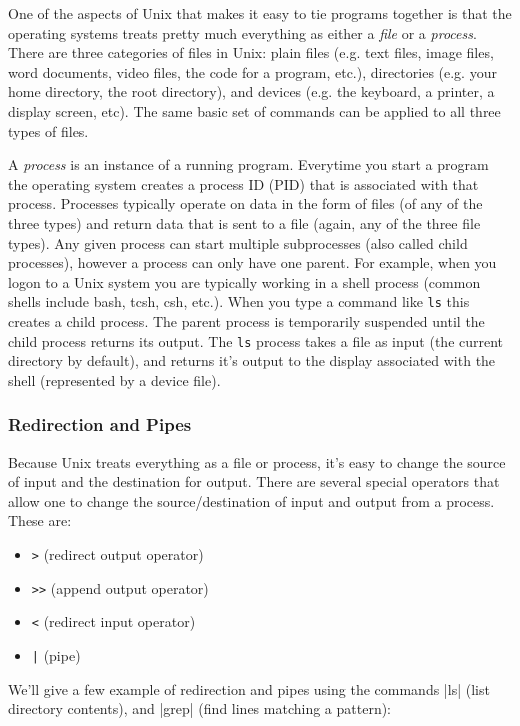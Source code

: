 \documentclass[10pt,letterpaper]{article}
\begin{document}
One of the aspects of Unix that makes it easy to tie programs together is that the operating systems treats pretty much everything as either a \emph{file} or a \emph{process}.  There are three categories of files in Unix: plain files (e.g. text files, image files, word documents, video files, the code for a program, etc.), directories (e.g. your home directory, the root directory), and devices (e.g. the keyboard, a printer, a display screen, etc). The same basic set of commands can be applied to all three types of files.

A \emph{process} is an instance of a running program.  Everytime you start a program the operating system creates a process ID (PID) that is associated with that process. Processes typically operate on data in the form of files (of any of the three types) and return data that is sent to a file (again, any of the three file types). Any given process can start multiple subprocesses (also called child processes), however a process can only have one parent. For example, when you logon to a Unix system you are typically working in a shell process (common shells include bash, tcsh, csh, etc.). When you type a command like \verb=ls= this creates a child process. The parent process is temporarily suspended until the child process returns its output. The \verb=ls= process takes a file as input (the current directory by default), and returns it's output to the display associated with the shell (represented by a device file).


\subsubsection*{Redirection and Pipes}

Because Unix treats everything as a file or process, it's easy to change the source of input and the destination for output. There are several special operators that allow one to change the source/destination of input and output from a process. These are:

\begin{itemize}
    \item \verb=>= (redirect output operator)
    \item \verb=>>= (append output operator)
    \item \verb=<= (redirect input operator)
    \item \verb=|= (pipe)
\end{itemize}

We'll give a few example of redirection and pipes using the commands |ls| (list directory contents), and |grep| (find lines matching a pattern):
\end{document}
